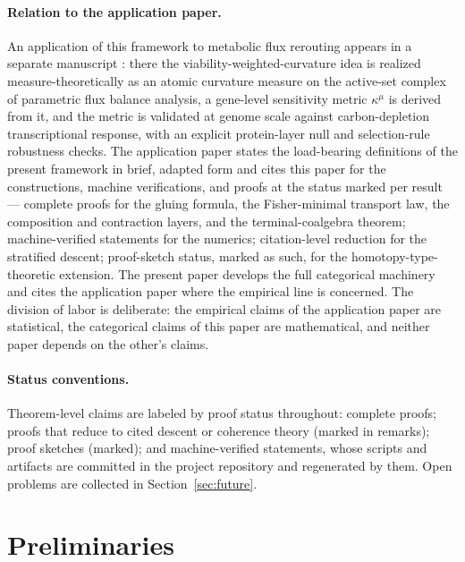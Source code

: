 \documentclass[11pt,a4paper]{article}
\theoremstyle{plain}
\theoremstyle{definition}
\theoremstyle{remark}
\begin{document}
\paragraph{Relation to the application paper.}
An application of this framework to metabolic flux rerouting appears
in a separate manuscript \citep{zai2026measure}: there the
viability-weighted-curvature idea is realized measure-theoretically
as an atomic curvature measure on the active-set complex of
parametric flux balance analysis, a gene-level sensitivity metric
$\kappa^{\mu}$ is derived from it, and the metric is validated at
genome scale against carbon-depletion transcriptional response,
with an explicit protein-layer null and selection-rule robustness
checks. The application paper states the load-bearing definitions
of the present framework in brief, adapted form and cites this
paper for the constructions, machine verifications, and proofs at
the status marked per result --- complete proofs for the gluing
formula, the Fisher-minimal transport law, the composition and
contraction layers, and the terminal-coalgebra theorem;
machine-verified statements for the numerics; citation-level
reduction for the stratified descent; proof-sketch status, marked
as such, for the homotopy-type-theoretic extension. The present
paper develops the full categorical machinery and cites the
application paper where the empirical line is concerned. The division of labor is
deliberate: the empirical claims of the application paper are
statistical, the categorical claims of this
paper are mathematical, and neither paper depends on the other's
claims.

\paragraph{Status conventions.}
Theorem-level claims are labeled by proof status throughout:
complete proofs; proofs that reduce to cited descent or coherence
theory (marked in remarks); proof sketches (marked); and
machine-verified statements, whose scripts and artifacts are
committed in the project repository and regenerated by them. Open
problems are collected in Section~\ref{sec:future}.

\section{Preliminaries}\label{sec:prelim}
\end{document}
